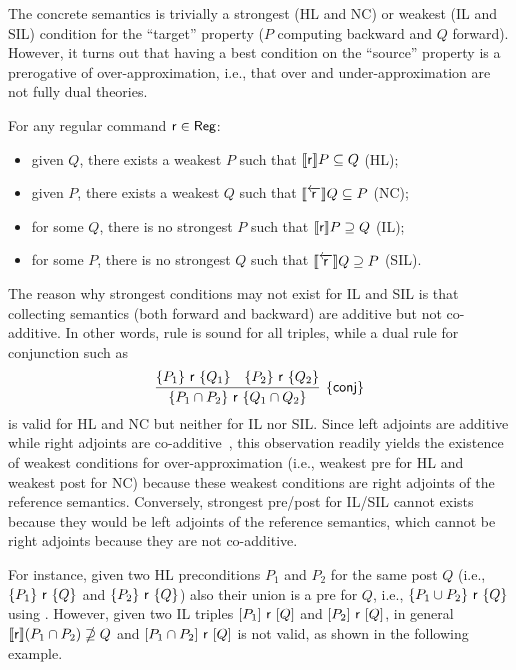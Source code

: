 The concrete semantics is trivially a strongest (HL and NC) or weakest (IL and SIL) condition for the ``target'' property ($P$ computing backward and $Q$ forward).
However, it turns out that having a best condition on the ``source'' property is a prerogative of over-approximation, i.e., that over and under-approximation are not fully dual theories.

\begin{prop}\label{prop:sil:best-condition-source}
	For any regular command $\mathsf{r}\in\mathsf{Reg}$:
	\begin{itemize}
		\item given $Q$, there exists a weakest $P$ such that $\llbracket\mathsf{r}\rrbracket P \subseteq Q$ (HL);
		\item given $P$, there exists a weakest $Q$ such that $\llbracket\overleftarrow{\mathsf{r}}\rrbracket Q \subseteq P$ (NC);
		\item for some $Q$, there is no strongest $P$ such that $\llbracket\mathsf{r}\rrbracket P \supseteq Q$ (IL);
		\item for some $P$, there is no strongest $Q$ such that $\llbracket\overleftarrow{\mathsf{r}}\rrbracket Q \supseteq P$ (SIL).
	\end{itemize}
\end{prop}

The reason why strongest conditions may not exist for IL and SIL is that collecting semantics (both forward and backward) are additive but not co-additive. In other words, rule  is sound for all triples, while a dual rule for conjunction such as
\[
\infer[\hlrule{conj}]
{\overtriple{P_1 \cap P_2}{\regr}{Q_1 \cap Q_2}}
{\overtriple{P_1}{\regr}{Q_1} & \overtriple{P_2}{\regr}{Q_2} }
\]
is valid for HL and NC but neither for IL nor SIL.
Since left adjoints are additive while right adjoints are co-additive~\cite{DP02}, this observation readily yields the existence of weakest conditions for over-approximation (i.e., weakest pre for HL and weakest post for NC) because these weakest conditions are right adjoints of the reference semantics. Conversely, strongest pre/post for IL/SIL cannot exists because they would be left adjoints of the reference semantics, which cannot be right adjoints because they are not co-additive.

For instance, given two HL preconditions $P_1$ and $P_2$ for the same post $Q$ (i.e., $\{P_1\}~\mathsf{r}~\{Q\}$ and $\{P_2\}~\mathsf{r}~\{Q\}$) also their union is a pre for $Q$, i.e., $\{P_1 \cup P_2\}~\mathsf{r}~\{Q\}$ using . However, given two IL triples $[P_1]~\mathsf{r}~[Q]$ and $[P_2]~\mathsf{r}~[Q]$, in general $\llbracket\mathsf{r}\rrbracket (P_1 \cap P_2) \nsupseteq Q$ and $[P_1 \cap P_2]~\mathsf{r}~[Q]$ is not valid, as shown in the following example.

